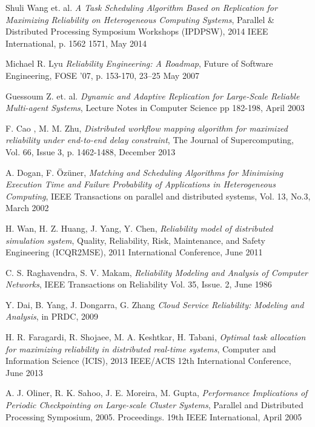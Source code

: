 \documentclass{cslthse-msc}
\begin{document}
\begin{thebibliography}{50}
	Shuli Wang et. al.
	\emph{A Task Scheduling Algorithm Based on Replication for Maximizing Reliability on Heterogeneous Computing Systems},
	Parallel \& Distributed Processing Symposium Workshops (IPDPSW), 2014 IEEE International, p. 1562 1571, 
	May 2014

	Michael R. Lyu
	\emph{Reliability Engineering: A Roadmap},
	Future of Software Engineering, FOSE ’07, p. 153-170,
	23–25 May 2007
	
	Guessoum Z. et. al.
	\emph{Dynamic and Adaptive Replication for Large-Scale Reliable Multi-agent Systems},
	Lecture Notes in Computer Science pp 182-198,
	April 2003

	F. Cao , M. M. Zhu,
	\emph{Distributed workflow mapping algorithm for maximized reliability under end-to-end delay constraint},
	The Journal of Supercomputing, Vol. 66, Issue 3, p. 1462-1488,
	December 2013

	A. Dogan, F. Özüner,
	\emph{Matching and Scheduling Algorithms for Minimising Execution Time and Failure Probability of Applications in Heterogeneous Computing},
	IEEE Transactions on parallel and distributed systems, Vol. 13, No.3,
	March 2002

	H. Wan, H. Z. Huang, J. Yang, Y. Chen,
	\emph{Reliability model of distributed simulation system},
	Quality, Reliability, Risk, Maintenance, and Safety Engineering (ICQR2MSE), 2011 International Conference,
	June 2011

	C. S. Raghavendra, S. V. Makam,
	\emph{Reliability Modeling and Analysis of Computer Networks},
	IEEE Transactions on Reliability  Vol. 35,  Issue. 2,
	June 1986

	Y. Dai, B. Yang, J. Dongarra, G. Zhang
	\emph{Cloud Service Reliability: Modeling and Analysis},
	in PRDC, 2009	

	H. R. Faragardi, R. Shojaee, M. A. Keshtkar, H. Tabani,
	\emph{Optimal task allocation for maximizing reliability in distributed real-time systems},
	Computer and Information Science (ICIS), 2013 IEEE/ACIS 12th International Conference,
	June 2013

	A. J. Oliner, R. K. Sahoo, J. E. Moreira, M. Gupta,
	\emph{Performance Implications of Periodic Checkpointing on Large-scale Cluster Systems},
	Parallel and Distributed Processing Symposium, 2005. Proceedings. 19th IEEE International,
	April 2005


\end{thebibliography}
\end{document}

